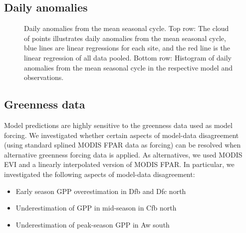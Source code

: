 \documentclass{myreport}
\begin{document}
\clearpage

\subsection{Daily anomalies}

 \begin{figure}[!ht]
    \centering
    \caption{Daily anomalies from the mean seasonal cycle. Top row: The cloud of points illustrates daily anomalies from the mean seasonal cycle, blue lines are linear regressions for each site, and the red line is the linear regression of all data pooled. Bottom row: Histogram of daily anomalies from the mean seasonal cycle in the respective model and observations.}
    \label{fig:modobs_anomalies}
\end{figure}

\clearpage

\subsection{Greenness data}

Model predictions are highly sensitive to the greenness data used as model forcing. We investigated whether certain aspects of model-data disagreement (using standard splined MODIS FPAR data as forcing) can be resolved when alternative greenness forcing data is applied. As alternatives, we used MODIS EVI and a linearly interpolated version of MODIS FPAR. In particular, we investigated the following aspects of model-data disagreement:
\begin{itemize}
    \item Early season GPP overestimation in Dfb and Dfc north 
    \item Underestimation of GPP in mid-season in Cfb north
    \item Underestimation of peak-season GPP in Aw south
\end{itemize}
\end{document}

